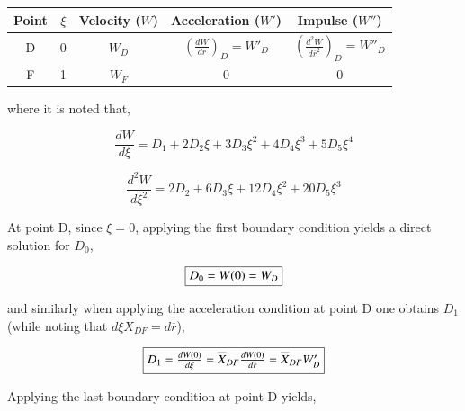 \begin{table}[!h]
\begin{center}
\begin{threeparttable}


\begin{tabular}{ccccc}
\toprule
Point	& $\xi$	&	Velocity ($W$)		&	Acceleration ($W'$) 	&	Impulse ($W''$)\\
\midrule
D	& 0	&$W_D$	& $(\frac{dW}{d\overline{r}})_D = W'_D$ & $(\frac{d^2W}{d\overline{r}^2})_D = W''_D$\\
F	& 1	&$W_F$	& 0 & 0 \\
\bottomrule
\end{tabular}


\label{table:dpoly}
\end{threeparttable}
\end{center}
\end{table}

	where it is noted that,

\begin{equation}
	\frac{dW}{d\xi} = D_1 + 2D_2\xi + 3D_3\xi^2 + 4D_4\xi^3 + 5D_5\xi^4
\label{eqn:dpolyfirst}
\end{equation}  

\begin{equation}
	\frac{d^2W}{d\xi ^2} = 2D_2 + 6D_3\xi + 12D_4\xi^2 + 20D_5\xi^3
\label{eqn:dpolysecond}
\end{equation}  

	At point D, since $\xi = 0$, applying the first boundary condition yields 
a direct solution for $D_0$,

\begin{equation}
	\fbox{$
	D_0 = W(0) = W_D 
	$}
\label{eqn:d0}
\end{equation}

	and similarly when applying the acceleration condition at point D one obtains $D_1$
(while noting that $d\xi X_{DF} = d\overline{r}$),

\begin{equation}
	\fbox{$
	D_1 = \frac{dW(0)}{d\xi} = \overline{X}_{DF}\frac{dW(0)}{d\overline{r}} = \overline{X}_{DF}W'_D
	$}
\label{eqn:d1}
\end{equation}

	Applying the last boundary condition at point D yields,

